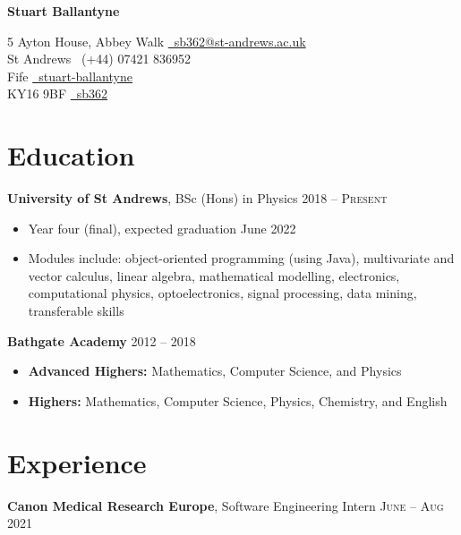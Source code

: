 \documentclass{article}
\begin{document}
	
	\begin{center}
		\par{{\Large \textbf{Stuart Ballantyne}}\par}
	\end{center}
	
	\begin{center}
		5 Ayton House, Abbey Walk \hfill \href{mailto:sb362@st-andrews.ac.uk}{\faEnvelope\ sb362@st-andrews.ac.uk}\\
		St Andrews \hfill \faMobile\ (+44) 07421 836952\\
		Fife \hfill \href{https://www.linkedin.com/in/stuart-ballantyne/}{\faLinkedin\ stuart-ballantyne}\\
		KY16 9BF \hfill \href{https://github.com/sb362}{\faGithub\ sb362}
	\end{center}
	
	\section*{Education}
		\textbf{University of St Andrews}, BSc (Hons) in Physics \hfill \textsc{2018 -- Present}
		\begin{itemize}
			\item Year four (final), expected graduation June 2022
			\item Modules include: object-oriented programming (using Java), multivariate and vector calculus, linear algebra, mathematical modelling, electronics, computational physics, optoelectronics, signal processing, data mining, transferable skills
		\end{itemize}
		\bigskip
		\textbf{Bathgate Academy} \hfill \textsc{2012 -- 2018}
		\begin{itemize}
			\item \textbf{Advanced Highers:} Mathematics, Computer Science, and Physics
			\item \textbf{Highers:} Mathematics, Computer Science, Physics, Chemistry, and English
		\end{itemize}	
	
	\section*{Experience}
		\textbf{Canon Medical Research Europe}, Software Engineering Intern \hfill \textsc{June -- Aug 2021}
		
\end{document}

